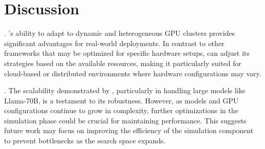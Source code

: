 \section{Discussion}

. \sysname's ability to adapt to dynamic and heterogeneous GPU clusters provides significant advantages for real-world deployments. In contrast to other frameworks that may be optimized for specific hardware setups, \sysname can adjust its strategies based on the available resources, making it particularly suited for cloud-based or distributed environments where hardware configurations may vary.

. The scalability demonstrated by \sysname, particularly in handling large models like Llama-70B, is a testament to its robustness. However, as models and GPU configurations continue to grow in complexity, further optimizations in the simulation phase could be crucial for maintaining performance. This suggests future work may focus on improving the efficiency of the simulation component to prevent bottlenecks as the search space expands.


